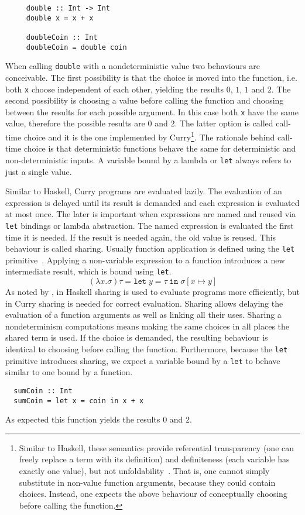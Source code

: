 \begin{verbatim}
     double :: Int -> Int
     double x = x + x
     
     doubleCoin :: Int
     doubleCoin = double coin
\end{verbatim}
When calling \texttt{double} with a nondeterministic value two behaviours are
conceivable.
The first possibility is that the choice is moved into the function, i.e. both
\texttt{x} choose independent of each other, yielding the results $0$, $1$, $1$
and $2$.
The second possibility is choosing a value before calling the function and
choosing between the results for each possible argument.
In this case both \texttt{x} have the same value, therefore the possible results
are $0$ and $2$.
The latter option is called call-time choice and it is the one implemented by
Curry\footnote{
Similar to Haskell, these semantics provide referential transparency (one
can freely replace a term with its definition) and definiteness (each variable has
exactly one value), but not unfoldability~\cite{DBLP:journals/acta/SondergaardS89}.
That is, one cannot simply substitute in non-value function arguments, because
they could contain choices.
Instead, one expects the above behaviour of conceptually choosing before calling
the function.}.
The rationale behind call-time choice is that deterministic functions behave the
same for deterministic and non-deterministic inputs.
A variable bound by a lambda or \texttt{let} always refers to just a single
value.

Similar to Haskell, Curry programs are evaluated lazily.
The evaluation of an expression is delayed until its result is demanded and each
expression is evaluated at most once.
The later is important when expressions are named and reused via \texttt{let}
bindings or lambda abstraction.
The named expression is evaluated the first time it is needed.
If the result is needed again, the old value is reused.
This behaviour is called sharing.
Usually function application is defined using the \texttt{let}
primitive~\cite{DBLP:conf/popl/Launchbury93}.
Applying a non-variable expression to a function introduces a new intermediate
result, which is bound using \texttt{let}.
$$
(\lambda x.\sigma) \tau = \texttt{let}\;y = \tau\;\texttt{in}\;\sigma[x\mapsto y]
$$
As noted by \textcite{DBLP:journals/corr/abs-2008-11999}, in Haskell sharing is
used to evaluate programs more efficiently, but in Curry sharing is needed for
correct evaluation.
Sharing allows delaying the evaluation of a function arguments as well as
linking all their uses.
Sharing a nondeterminism computations means making the same choices in all
places the shared term is used.
If the choice is demanded, the resulting behaviour is identical to choosing
before calling the function.
Furthermore, because the \texttt{let} primitive introduces sharing, we expect a
variable bound by a \texttt{let} to behave similar to one bound by a function.
\begin{verbatim}
  sumCoin :: Int
  sumCoin = let x = coin in x + x
\end{verbatim}
As expected this function yields the results $0$ and $2$.

